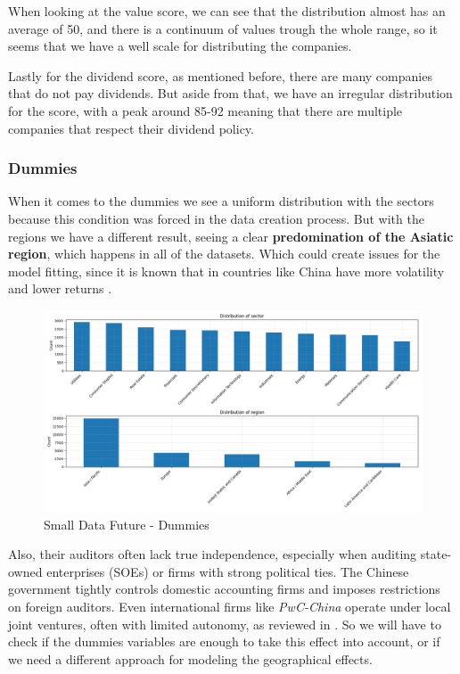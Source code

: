 \documentclass[11pt,english,a4paper,hidelinks]{book}
\begin{document}
\vspace{0.5cm}
\noindent When looking at the value score, we can see that the distribution almost has an average of 50, and there is a continuum of values trough the whole range, so it seems that we have a well scale for distributing the companies.

\vspace{0.5cm}
\noindent Lastly for the dividend score, as mentioned before, there are many companies that do not pay dividends. But aside from that, we have an irregular distribution for the score, with a peak around 85-92 meaning that there are multiple companies that respect their dividend policy.

\subsubsection{Dummies}

When it comes to the dummies we see a uniform distribution with the sectors because this condition was forced in the data creation process. But with the regions we have a different result, seeing a clear \textbf{predomination of the Asiatic region}, which happens in all of the datasets. Which could create issues for the model fitting, since it is known that in countries like China have more volatility and lower returns \textcite{chen2024economic}.

\begin{figure}[H]
    \centering
    \includegraphics[width=1\linewidth]{images/code/descriptive analysis/distributions/Small Data future - Dummies.png}
    \caption{Small Data Future - Dummies}
    \label{fig:small_future_dummies}
\end{figure}

\noindent  Also, their auditors often lack true independence, especially when auditing state-owned enterprises (SOEs) or firms with strong political ties. The Chinese government tightly controls domestic accounting firms and imposes restrictions on foreign auditors. Even international firms like \textit{PwC-China} operate under local joint ventures, often with limited autonomy, as reviewed in \textcite{LIU2012782}. So we will have to check if the dummies variables are enough to take this effect into account, or if we need a different approach for modeling the geographical effects.
\end{document}
